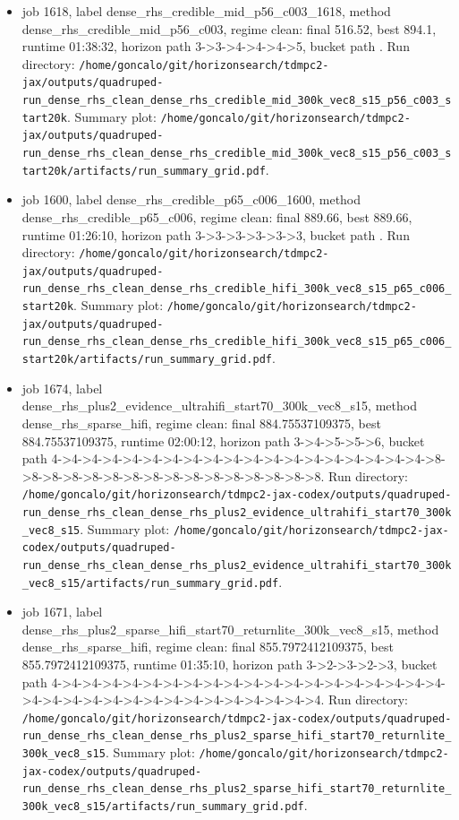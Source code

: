 \begin{itemize}
\item job 1618, label dense\_rhs\_credible\_mid\_p56\_c003\_1618, method dense\_rhs\_credible\_mid\_p56\_c003, regime clean: final 516.52, best 894.1, runtime 01:38:32, horizon path 3->3->4->4->4->5, bucket path . Run directory: \texttt{/home/goncalo/git/horizonsearch/tdmpc2-jax/outputs/quadruped-run\_dense\_rhs\_clean\_dense\_rhs\_credible\_mid\_300k\_vec8\_s15\_p56\_c003\_start20k}. Summary plot: \texttt{/home/goncalo/git/horizonsearch/tdmpc2-jax/outputs/quadruped-run\_dense\_rhs\_clean\_dense\_rhs\_credible\_mid\_300k\_vec8\_s15\_p56\_c003\_start20k/artifacts/run\_summary\_grid.pdf}.
\item job 1600, label dense\_rhs\_credible\_p65\_c006\_1600, method dense\_rhs\_credible\_p65\_c006, regime clean: final 889.66, best 889.66, runtime 01:26:10, horizon path 3->3->3->3->3->3, bucket path . Run directory: \texttt{/home/goncalo/git/horizonsearch/tdmpc2-jax/outputs/quadruped-run\_dense\_rhs\_clean\_dense\_rhs\_credible\_hifi\_300k\_vec8\_s15\_p65\_c006\_start20k}. Summary plot: \texttt{/home/goncalo/git/horizonsearch/tdmpc2-jax/outputs/quadruped-run\_dense\_rhs\_clean\_dense\_rhs\_credible\_hifi\_300k\_vec8\_s15\_p65\_c006\_start20k/artifacts/run\_summary\_grid.pdf}.
\item job 1674, label dense\_rhs\_plus2\_evidence\_ultrahifi\_start70\_300k\_vec8\_s15, method dense\_rhs\_sparse\_hifi, regime clean: final 884.75537109375, best 884.75537109375, runtime 02:00:12, horizon path 3->4->5->5->6, bucket path 4->4->4->4->4->4->4->4->4->4->4->4->4->4->4->4->4->4->4->8->8->8->8->8->8->8->8->8->8->8->8->8->8->8->8. Run directory: \texttt{/home/goncalo/git/horizonsearch/tdmpc2-jax-codex/outputs/quadruped-run\_dense\_rhs\_clean\_dense\_rhs\_plus2\_evidence\_ultrahifi\_start70\_300k\_vec8\_s15}. Summary plot: \texttt{/home/goncalo/git/horizonsearch/tdmpc2-jax-codex/outputs/quadruped-run\_dense\_rhs\_clean\_dense\_rhs\_plus2\_evidence\_ultrahifi\_start70\_300k\_vec8\_s15/artifacts/run\_summary\_grid.pdf}.
\item job 1671, label dense\_rhs\_plus2\_sparse\_hifi\_start70\_returnlite\_300k\_vec8\_s15, method dense\_rhs\_sparse\_hifi, regime clean: final 855.7972412109375, best 855.7972412109375, runtime 01:35:10, horizon path 3->2->3->2->3, bucket path 4->4->4->4->4->4->4->4->4->4->4->4->4->4->4->4->4->4->4->4->4->4->4->4->4->4->4->4->4->4->4->4->4->4->4. Run directory: \texttt{/home/goncalo/git/horizonsearch/tdmpc2-jax-codex/outputs/quadruped-run\_dense\_rhs\_clean\_dense\_rhs\_plus2\_sparse\_hifi\_start70\_returnlite\_300k\_vec8\_s15}. Summary plot: \texttt{/home/goncalo/git/horizonsearch/tdmpc2-jax-codex/outputs/quadruped-run\_dense\_rhs\_clean\_dense\_rhs\_plus2\_sparse\_hifi\_start70\_returnlite\_300k\_vec8\_s15/artifacts/run\_summary\_grid.pdf}.

\end{itemize}
